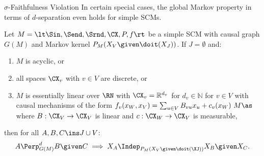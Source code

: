 \begin{frame}{$\sigma$-Faithfulness Violation}
In certain special cases, the global Markov property in terms of $d$-separation even holds for simple SCMs.
\begin{Prp}[\ref{prp:when_d-separation_holds}]
  Let $M = \lt \Sin, \Send, \Srnd, \CX, P, f \rt$ be a simple SCM with causal graph $G(M)$
  and Markov kernel $P_{M}(X_V \given \doit(X_J))$.
  If $J = \emptyset$ and:
  \begin{enumerate}
    \item $M$ is acyclic, or
    \item all spaces $\CX_v$ with $v \in V$ are discrete, or
    \item %
      $M$ is essentially linear over $\RN$ with $\CX_v = \mathbb{R}^{d_v}$ for $d_v \in \mathbb{N}$ for $v \in V$ with
      causal mechanisms of the form
      $ f_v(x_W,x_V) = \sum_{u\in V} B_{vu} x_u + c_v(x_W) \ M\as$
      where $B : \CX_V \to \CX_V$ is linear and $c : \CX_W \to \CX_V$ is measurable,
  \end{enumerate} 
  then for all $A, B, C \ins J \cup V$:
  $$A \Perp^d_{G(M)} B \given C \implies X_A \Indep_{P_{M}(X_V \given \doit(\XJ))} X_B \given X_C.$$
\end{Prp}
\end{frame}

